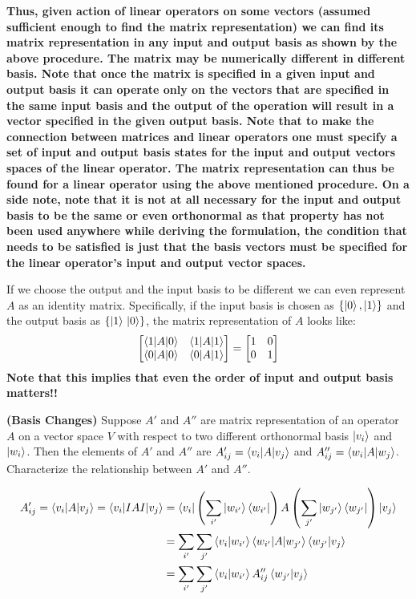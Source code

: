 \textbf{Thus, given action of linear operators on some vectors (assumed sufficient enough to find the matrix representation) we can find its 
matrix representation in any input and output basis as shown by the above procedure. The matrix may be numerically different in different basis. 
Note that once the matrix is specified in a given input and output basis it can operate only on the vectors that are specified in the same input basis and the 
output of the operation will result in a vector specified in the given output basis. Note that to make the connection between matrices and linear operators one must specify
a set of input and output basis states for the input and output vectors spaces of the linear operator. The 
matrix representation can thus be found for a linear operator using the above mentioned procedure. On a side note, note that it is not
at all necessary for the input and output basis to be the same or even orthonormal as that property has not been used anywhere while deriving the formulation, the condition that needs to be satisfied is just that the 
basis vectors must be specified for the linear operator's input and output vector spaces.}\\
\begin{importantnote}
    \begin{remark}
    If we choose the output and the input basis to be different we can even represent $A$ as an identity matrix. Specifically, if the input basis is chosen as $\{\ket{0},\ket{1}\}$ and the output basis as $\{\ket{1}\,\ket{0}\}$, the matrix representation of $A$ looks like:
    \[
    \begin{bmatrix} \braket{1|A|0} & \braket{1|A|1} \\
    \braket{0|A|0} & \braket{0|A|1} \end{bmatrix} = 
    \begin{bmatrix} 1 & 0 \\ 0 & 1 \end{bmatrix}
    \]
    \textbf{Note that this implies that even the order of input and output basis matters!!}
    \end{remark}
\end{importantnote}
\begin{example}
    \textbf{(Basis Changes)} Suppose $A'$ and $A''$ are matrix representation of an operator $A$ on a vector space $V$ with respect to two different orthonormal basis $\ket{v_i}$ and $\ket{w_i}$. Then the elements of $A'$ and $A''$ are $A_{ij}'=\braket{v_i|A|v_j}$ and $A_{ij}''= \braket{w_i|A|w_j}$. Characterize the relationship between $A'$ and $A''$.

    \begin{align*}
        A_{ij}'=\braket{v_i|A|v_j}=\braket{v_i|IAI|v_j}&=\braket{v_i|\left(\sum_{i'}\ket{w_{i'}}\bra{w_{i'}}\right)A\left(\sum_{j'}\ket{w_{j'}}\bra{w_{j'}}\right)|v_j}\\
        &=\sum_{i'}\sum_{j'}\braket{v_i|w_{i'}}\braket{w_{i'}|A|w_{j'}}\braket{w_{j'}|v_j}\\
&=\sum_{i'}\sum_{j'}\braket{v_i|w_{i'}}A_{ij}''\braket{w_{j'}|v_j}
    \end{align*}
\end{example}
